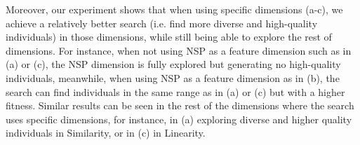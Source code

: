 

Moreover, our experiment shows that when using specific dimensions (a-c), we achieve a relatively better search (i.e. find more diverse and high-quality individuals) in those dimensions, while still being able to explore the rest of dimensions. For instance, when not using NSP as a feature dimension such as in (a) or (c), the NSP dimension is fully explored but generating no high-quality individuals, meanwhile, when using NSP as a feature dimension as in (b), the search can find individuals in the same range as in (a) or (c) but with a higher fitness. 
Similar results can be seen in the rest of the dimensions where the search uses specific dimensions, for instance, in (a) exploring diverse and higher quality individuals in Similarity, or in (c) in Linearity.



